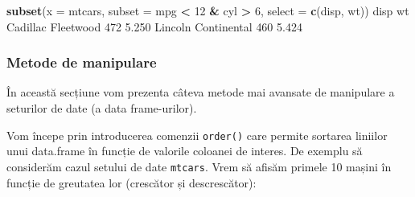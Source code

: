 \documentclass[]{article}
\newenvironment{Shaded}{\begin{snugshade}}{\end{snugshade}}
\newcommand{\DataTypeTok}[1]{\textcolor[rgb]{0.13,0.29,0.53}{#1}}
\newcommand{\DecValTok}[1]{\textcolor[rgb]{0.00,0.00,0.81}{#1}}
\newcommand{\FloatTok}[1]{\textcolor[rgb]{0.00,0.00,0.81}{#1}}
\newcommand{\KeywordTok}[1]{\textcolor[rgb]{0.13,0.29,0.53}{\textbf{#1}}}
\newcommand{\NormalTok}[1]{#1}
\newcommand{\OperatorTok}[1]{\textcolor[rgb]{0.81,0.36,0.00}{\textbf{#1}}}
\newcommand{\StringTok}[1]{\textcolor[rgb]{0.31,0.60,0.02}{#1}}
\begin{document}
\begin{Shaded}
\begin{Highlighting}[]
\KeywordTok{subset}\NormalTok{(}\DataTypeTok{x =}\NormalTok{ mtcars,}
      \DataTypeTok{subset =}\NormalTok{ mpg }\OperatorTok{<}\StringTok{ }\DecValTok{12} \OperatorTok{&}
\StringTok{               }\NormalTok{cyl }\OperatorTok{>}\StringTok{ }\DecValTok{6}\NormalTok{,}
      \DataTypeTok{select =} \KeywordTok{c}\NormalTok{(disp, wt))}
\NormalTok{                    disp    wt}
\NormalTok{Cadillac Fleetwood   }\DecValTok{472} \FloatTok{5.250}
\NormalTok{Lincoln Continental  }\DecValTok{460} \FloatTok{5.424}
\end{Highlighting}
\end{Shaded}

\hypertarget{metode-de-manipulare}{%
\subsubsection{Metode de manipulare}\label{metode-de-manipulare}}

În această secțiune vom prezenta câteva metode mai avansate de
manipulare a seturilor de date (a data frame-urilor).

Vom începe prin introducerea comenzii \texttt{order()} care permite
sortarea liniilor unui data.frame în funcție de valorile coloanei de
interes. De exemplu să considerăm cazul setului de date \texttt{mtcars}.
Vrem să afisăm primele 10 mașini în funcție de greutatea lor (crescător
și descrescător):
\end{document}
